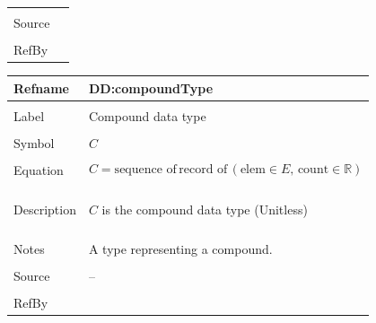 \documentclass[12pt]{article}
\begin{document}
\begin{minipage}{\textwidth}
\begin{tabular}{>{\raggedright}p{}>{\raggedright\arraybackslash}p{}}
\\ \midrule \\
Source & \cite{smithChemSpec}
         
\\ \midrule \\
RefBy & 
\\ \bottomrule
\end{tabular}
\end{minipage}
\vspace{\baselineskip}
\noindent
\begin{minipage}{\textwidth}
\begin{tabular}{>{\raggedright}p{}>{\raggedright\arraybackslash}p{}}
\toprule \textbf{Refname} & \textbf{DD:compoundType}
\label{DD:compoundType}
\\ \midrule \\
Label & Compound data type
        
\\ \midrule \\
Symbol & $C$
         
\\ \midrule \\
Equation & \begin{displaymath}
           C=\text{sequence of}\,\text{record of}\,\left(\text{elem}\in{}E,\,\text{count}\in{}\mathbb{R}\right)
           \end{displaymath}
\\ \midrule \\
Description & \begin{symbDescription}
              \item{$C$ is the compound data type (Unitless)}
              \end{symbDescription}
\\ \midrule \\
Notes & A type representing a compound.
        
\\ \midrule \\
Source & --
         
\\ \midrule \\
RefBy & 
\\ \bottomrule
\end{tabular}
\end{minipage}
\vspace{\baselineskip}
\noindent
\end{document}
